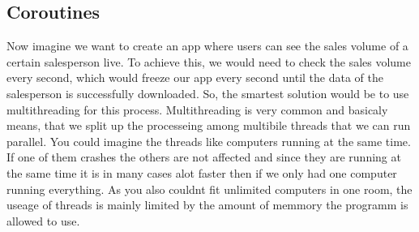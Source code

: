 \documentclass[a4paper,11pt]{article}
\begin{document}
\subsection{Coroutines}
Now imagine we want to create an app where users can see the sales volume of a certain salesperson live. To achieve this, we would need to check the sales volume every second, which would freeze our app every second until the data of the salesperson is successfully downloaded. So, the smartest solution would be to use multithreading for this process. Multithreading is very common and basicaly means, that we split up the processeing among multibile threads that we can run parallel. You could imagine the threads like computers  running at the same time. If one of them crashes the others are not affected and since they are running at the same time it is in many cases alot faster then if we only had one computer running everything. As you also couldnt fit unlimited computers in one room, the useage of threads is mainly limited by the amount of memmory the programm is allowed to use.
\end{document}
